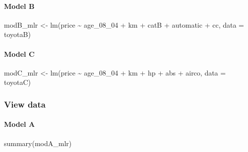 \documentclass[
]{article}
\newenvironment{Shaded}{\begin{snugshade}}{\end{snugshade}}
\newcommand{\AttributeTok}[1]{\textcolor[rgb]{0.77,0.63,0.00}{#1}}
\newcommand{\FunctionTok}[1]{\textcolor[rgb]{0.00,0.00,0.00}{#1}}
\newcommand{\NormalTok}[1]{#1}
\newcommand{\OtherTok}[1]{\textcolor[rgb]{0.56,0.35,0.01}{#1}}
\newcommand{\SpecialCharTok}[1]{\textcolor[rgb]{0.00,0.00,0.00}{#1}}
\begin{document}
\hypertarget{model-b-7}{%
\paragraph{Model B}\label{model-b-7}}

\begin{Shaded}
\begin{Highlighting}[]
\NormalTok{modB\_mlr }\OtherTok{\textless{}{-}} \FunctionTok{lm}\NormalTok{(price }\SpecialCharTok{\textasciitilde{}}\NormalTok{ age\_08\_04 }\SpecialCharTok{+}\NormalTok{ km }\SpecialCharTok{+}\NormalTok{ catB }\SpecialCharTok{+} 
\NormalTok{               automatic }\SpecialCharTok{+}\NormalTok{ cc, }\AttributeTok{data =}\NormalTok{ toyotaB)}
\end{Highlighting}
\end{Shaded}

\hypertarget{model-c-6}{%
\paragraph{Model C}\label{model-c-6}}

\begin{Shaded}
\begin{Highlighting}[]
\NormalTok{modC\_mlr }\OtherTok{\textless{}{-}} \FunctionTok{lm}\NormalTok{(price }\SpecialCharTok{\textasciitilde{}}\NormalTok{ age\_08\_04 }\SpecialCharTok{+}\NormalTok{ km }\SpecialCharTok{+}\NormalTok{ hp }\SpecialCharTok{+}
\NormalTok{                 abs }\SpecialCharTok{+}\NormalTok{ airco, }\AttributeTok{data =}\NormalTok{ toyotaC)}
\end{Highlighting}
\end{Shaded}

\hypertarget{view-data-2}{%
\subsubsection{View data}\label{view-data-2}}

\hypertarget{model-a-8}{%
\paragraph{Model A}\label{model-a-8}}

\begin{Shaded}
\begin{Highlighting}[]
\FunctionTok{summary}\NormalTok{(modA\_mlr)}
\end{Highlighting}
\end{Shaded}
\end{document}
